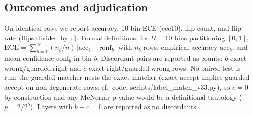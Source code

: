 \documentclass[10pt]{article} %
\begin{document}
\subsection{Outcomes and adjudication}

On identical rows we report accuracy, 10-bin ECE (ece10), flip count, and flip rate (flips divided by n). Formal definitions: for $B=10$ bins partitioning $[0,1]$, $\mathrm{ECE} = \sum_{b=1}^{B} (n_b/n)\,|\mathrm{acc}_b - \mathrm{conf}_b|$ with $n_b$ rows, empirical accuracy $\mathrm{acc}_b$, and mean confidence $\mathrm{conf}_b$ in bin $b$. Discordant pairs are reported as counts: $b$ exact-wrong/guarded-right and $c$ exact-right/guarded-wrong rows. No paired test is run: the guarded matcher nests the exact matcher (exact accept implies guarded accept on non-degenerate rows; cf.\ code, scripts/label\_match\_v33.py), so $c=0$ by construction and any McNemar p-value would be a definitional tautology ($p=2/2^b$). Layers with $b+c=0$ are reported as no discordants.
\end{document}
